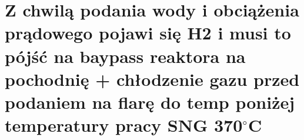 \section{Z chwilą podania wody i obciążenia prądowego pojawi się H2 i musi
to pójść na baypass reaktora na pochodnię + chłodzenie gazu przed
podaniem na flarę do temp poniżej temperatury pracy SNG 370$^{\circ}$C}